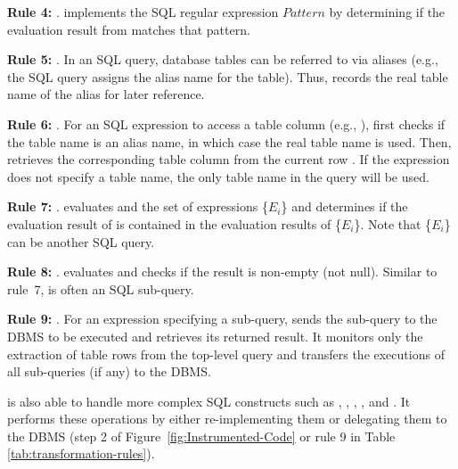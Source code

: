 \textbf{Rule 4:} . \tool{}
implements the SQL regular expression $Pattern$ by determining if the
evaluation result from  matches that pattern.

\textbf{Rule 5:} . In an SQL query,
database tables can be referred to via aliases (e.g., the SQL query
 assigns the alias
name  for the  table). Thus, \tool{}
records the real table name of the alias for later reference.

\textbf{Rule 6:} . For an SQL expression
to access a table column (e.g., ), \tool{} first checks
if the table name is an alias name, in which case the real table name
is used. Then, \tool{} retrieves the corresponding table column from
the current row . If the expression does not specify a table
name, the only table name in the query will be used.


\textbf{Rule 7:} .
\tool{} evaluates  and the set of expressions \{$E_i$\}
and determines if the evaluation result of  is contained
in the evaluation results of \{$E_i$\}. Note that \{$E_i$\} can be
another SQL  query.

\textbf{Rule 8:} . \tool{} evaluates 
and checks if the result is non-empty (not null). Similar to
rule~7,  is often an SQL sub-query.


\textbf{Rule 9:} . For an expression specifying
a sub-query, \tool{} sends the sub-query to the DBMS to be
executed and retrieves its returned result. It monitors only the
extraction of table rows from the top-level query and transfers the
executions of all sub-queries (if any) to the DBMS.


\tool{} is also able to handle more complex SQL
constructs such as , , ,
, and . It performs these operations by
either re-implementing them or delegating them to the DBMS (step 2 of
Figure~\ref{fig:Instrumented-Code} or rule 9 in Table
\ref{tab:transformation-rules}).

